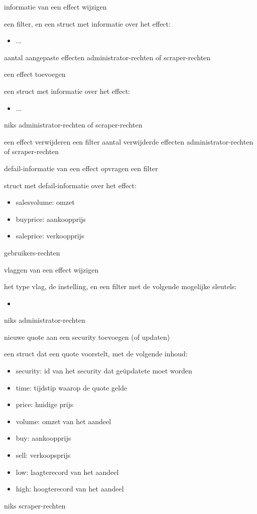 	{ informatie van een effect wijzigen }
	{ een filter, en een struct met informatie over het effect:
		\begin{itemize}
		\item{...}
		\end{itemize} }
	{ aantal aangepaste effecten }
	{ administrator-rechten of scraper-rechten }

	{ een effect toevoegen }
	{ een struct met informatie over het effect:
		\begin{itemize}
		\item{...}
		\end{itemize} }
	{ niks }
	{ administrator-rechten of scraper-rechten }
	
{ een effect verwijderen }
{ een filter }
{ aantal verwijderde effecten }
{ administrator-rechten of scraper-rechten }

	{ defail-informatie van een effect opvragen }
	{ een filter }
	{ struct met defail-informatie over het effect:
		\begin{itemize}
		\item{salesvolume: omzet}
		\item{buyprice: aankoopprijs}
		\item{saleprice: verkoopprijs}
		\end{itemize} }
	{ gebruikers-rechten }

	{ vlaggen van een effect wijzigen }
	{ het type vlag, de instelling, en een filter met de volgende mogelijke sleutels:
		\begin{itemize}
		\item{}
		\end{itemize} }
	{ niks }
	{ administrator-rechten }

	{ nieuwe quote aan een security toevoegen (of updaten) }
	{ een struct dat een quote voorstelt, met de volgende inhoud:
		\begin{itemize}
		\item{security: id van het security dat ge\"updatete moet worden}
		\item{time: tijdstip waarop de quote gelde}
		\item{price: huidige prijs}
		\item{volume: omzet van het aandeel}
		\item{buy: aankoopprijs}
		\item{sell: verkoopsprijs}
		\item{low: laagterecord van het aandeel}
		\item{high: hoogterecord van het aandeel}
		\end{itemize} }
	{ niks }
	{ scraper-rechten }

